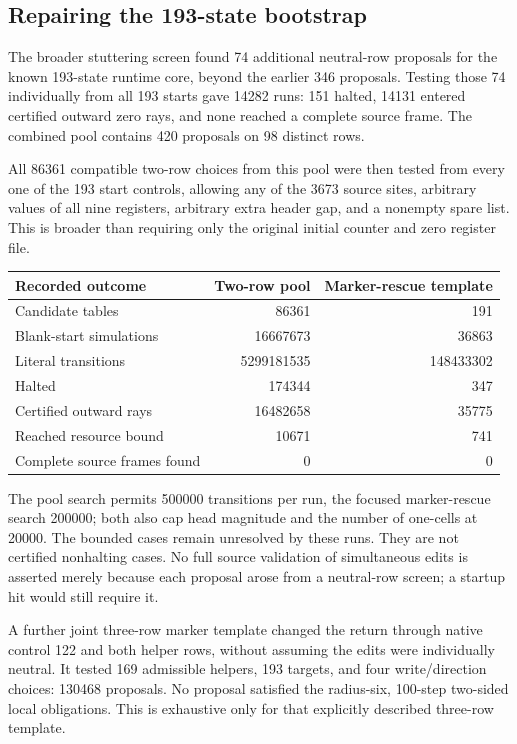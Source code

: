 \subsection{Repairing the 193-state bootstrap}

The broader stuttering screen found 74 additional neutral-row proposals
for the known 193-state runtime core, beyond the earlier 346 proposals.
Testing those 74 individually from all 193 starts gave 14282 runs:
151 halted, 14131 entered certified outward zero rays, and none reached
a complete source frame. The combined pool contains 420 proposals on
98 distinct rows.

All 86361 compatible two-row choices from this pool were then tested
from every one of the 193 start controls, allowing any of the 3673
source sites, arbitrary values of all nine registers, arbitrary extra
header gap, and a nonempty spare list. This is broader than requiring
only the original initial counter and zero register file.

\begin{center}\small
\begin{tabular}{lrr}
\toprule
Recorded outcome & Two-row pool & Marker-rescue template\\
\midrule
Candidate tables & 86361 & 191\\
Blank-start simulations & 16667673 & 36863\\
Literal transitions & 5299181535 & 148433302\\
Halted & 174344 & 347\\
Certified outward rays & 16482658 & 35775\\
Reached resource bound & 10671 & 741\\
Complete source frames found & 0 & 0\\
\bottomrule
\end{tabular}
\end{center}

The pool search permits 500000 transitions per run, the focused
marker-rescue search 200000; both also cap head magnitude and the number
of one-cells at 20000. The bounded cases remain unresolved by these
runs. They are not certified nonhalting cases. No full source validation
of simultaneous edits is asserted merely because each proposal arose
from a neutral-row screen; a startup hit would still require it.

A further joint three-row marker template changed the return through
native control 122 and both helper rows, without assuming the edits
were individually neutral. It tested 169 admissible helpers, 193
targets, and four write/direction choices: 130468 proposals. No proposal
satisfied the radius-six, 100-step two-sided local obligations. This
is exhaustive only for that explicitly described three-row template.


